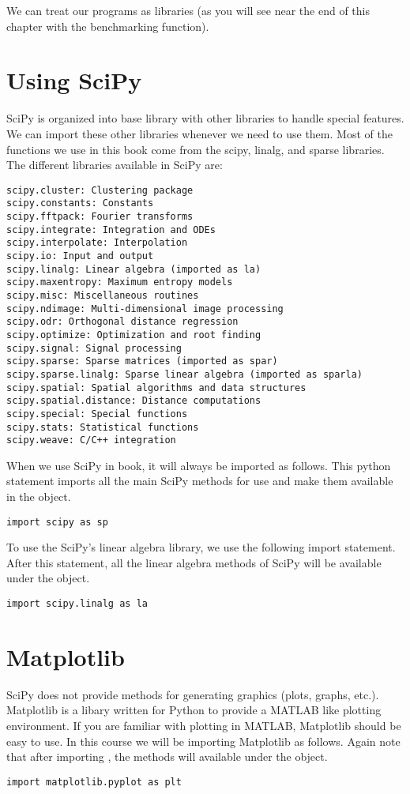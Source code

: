 We can treat our programs as libraries (as you will see near the end of this chapter with the benchmarking function).

\section*{Using SciPy}
SciPy is organized into base library with other libraries to handle special features.  We can import these other libraries whenever we need to use them.  Most of the functions we use in this book come from the scipy, linalg, and sparse libraries. The different libraries available in SciPy are:
\begin{lstlisting}
scipy.cluster: Clustering package
scipy.constants: Constants
scipy.fftpack: Fourier transforms
scipy.integrate: Integration and ODEs
scipy.interpolate: Interpolation
scipy.io: Input and output
scipy.linalg: Linear algebra (imported as la)
scipy.maxentropy: Maximum entropy models
scipy.misc: Miscellaneous routines
scipy.ndimage: Multi-dimensional image processing
scipy.odr: Orthogonal distance regression
scipy.optimize: Optimization and root finding
scipy.signal: Signal processing
scipy.sparse: Sparse matrices (imported as spar)
scipy.sparse.linalg: Sparse linear algebra (imported as sparla)
scipy.spatial: Spatial algorithms and data structures
scipy.spatial.distance: Distance computations
scipy.special: Special functions
scipy.stats: Statistical functions
scipy.weave: C/C++ integration
\end{lstlisting}

When we use SciPy in book, it will always be imported as follows. This python statement imports all the main SciPy methods for use and make them available in the  object.
\begin{lstlisting}
import scipy as sp
\end{lstlisting}

To use the SciPy's linear algebra library, we use the following import statement.  After this statement, all the linear algebra methods of SciPy will be available under the  object.
\begin{lstlisting}
import scipy.linalg as la
\end{lstlisting}

\section*{Matplotlib}
SciPy does not provide methods for generating graphics (plots, graphs, etc.).  Matplotlib is a libary written for Python to provide a MATLAB like plotting environment.  If you are familiar with plotting in MATLAB, Matplotlib should be easy to use.  In this course we will be importing Matplotlib as follows.  Again note that after importing , the methods will available under the  object.
\begin{lstlisting}
import matplotlib.pyplot as plt
\end{lstlisting}

